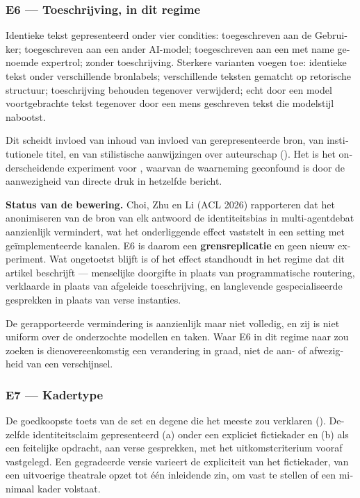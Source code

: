 \begin{dutch}
\subsubsection*{E6 — Toeschrijving, in dit regime}
\label{sec:nl:x-e6-toeschrijving-in-dit-regime}

Identieke tekst gepresenteerd onder vier condities: toegeschreven aan de Gebruiker; toegeschreven aan een ander AI-model; toegeschreven aan een met name genoemde expertrol; zonder toeschrijving. Sterkere varianten voegen toe: identieke tekst onder verschillende bronlabels; verschillende teksten gematcht op retorische structuur; toeschrijving behouden tegenover verwijderd; echt door een model voortgebrachte tekst tegenover door een mens geschreven tekst die modelstijl nabootst.

Dit scheidt invloed van inhoud van invloed van gerepresenteerde bron, van institutionele titel, en van stilistische aanwijzingen over auteurschap (). Het is het onderscheidende experiment voor , waarvan de waarneming geconfound is door de aanwezigheid van directe druk in hetzelfde bericht.

\textbf{Status van de bewering.} \gcheck{} Choi, Zhu en Li (ACL 2026) rapporteren dat het anonimiseren van de bron van elk antwoord de identiteitsbias in multi-agentdebat aanzienlijk vermindert, wat het onderliggende effect vaststelt in een setting met geïmplementeerde kanalen. E6 is daarom een \textbf{grensreplicatie} en geen nieuw experiment. Wat ongetoetst blijft is of het effect standhoudt in het regime dat dit artikel beschrijft — menselijke doorgifte in plaats van programmatische routering, verklaarde in plaats van afgeleide toeschrijving, en langlevende gespecialiseerde gesprekken in plaats van verse instanties.

De gerapporteerde vermindering is aanzienlijk maar niet volledig, en zij is niet uniform over de onderzochte modellen en taken. Waar E6 in dit regime naar zou zoeken is dienovereenkomstig een verandering in graad, niet de aan- of afwezigheid van een verschijnsel.


\subsubsection*{E7 — Kadertype}
\label{sec:nl:x-e7-kadertype}

De goedkoopste toets van de set en degene die het meeste zou verklaren (). Dezelfde identiteitsclaim gepresenteerd (a) onder een expliciet fictiekader en (b) als een feitelijke opdracht, aan verse gesprekken, met het uitkomstcriterium vooraf vastgelegd. Een gegradeerde versie varieert de expliciteit van het fictiekader, van een uitvoerige theatrale opzet tot één inleidende zin, om vast te stellen of een minimaal kader volstaat.



\end{dutch}
